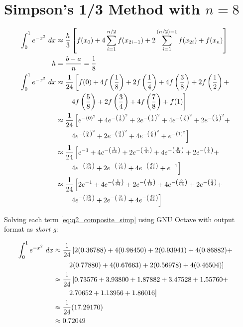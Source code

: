 \section{Simpson's 1/3 Method with $n = 8$}
	\begin{align}
		\int_{0}^{1} e^{-x^{2}} \ dx &\approx  \frac{h}{3}\left[
		f(x_{0})+
		4 \sum_{i=1}^{n/2} f(x_{2i-1}) +
		2 \sum_{i=1}^{(n/2)-1} f(x_{2i}) +
		f(x_{n})
		\right]& \\
		h &= \frac{b-a}{n} = \frac{1}{8}& \\
		\int_{0}^{1} e^{-x^{2}} \ dx &\approx  \frac{1}{24}\left[
			f(0)+
			4f\left(\frac{1}{8}\right)+
			2f\left(\frac{1}{4}\right)+
			4f\left(\frac{3}{8}\right)+
			2f\left(\frac{1}{2}\right)+
			\right.& \notag \\ &\left. \quad \quad
			4f\left(\frac{5}{8}\right)+
			2f\left(\frac{3}{4}\right)+
			4f\left(\frac{7}{8}\right)+
			f(1)
		\right]& \\
		&\approx \frac{1}{24}\left[
			e^{-(0)^{2}}+
			4e^{-\left(\frac{1}{8}\right)^{2}}+
			2e^{-\left(\frac{1}{4}\right)^{2}}+
			4e^{-\left(\frac{3}{8}\right)^{2}}+
			2e^{-\left(\frac{1}{2}\right)^{2}}+
			\right.& \notag \\ &\left. \quad \quad
			4e^{-\left(\frac{5}{8}\right)^{2}}+
			2e^{-\left(\frac{3}{4}\right)^{2}}+
			4e^{-\left(\frac{7}{8}\right)^{2}}+
			e^{-(1)^{2}}
		\right]& \notag \\
		&\approx \frac{1}{24}\left[
			e^{-1}+
			4e^{-\left(\frac{1}{64}\right)}+
			2e^{-\left(\frac{1}{16}\right)}+
			4e^{-\left(\frac{9}{64}\right)}+
			2e^{-\left(\frac{1}{4}\right)}+
			\right.& \notag \\ &\left. \quad \quad
			4e^{-\left(\frac{25}{64}\right)}+
			2e^{-\left(\frac{9}{16}\right)}+
			4e^{-\left(\frac{49}{64}\right)}+
			e^{-1}
		\right] \notag \\
		&\approx \frac{1}{24}\left[
			2e^{-1}+
			4e^{-\left(\frac{1}{64}\right)}+
			2e^{-\left(\frac{1}{16}\right)}+
			4e^{-\left(\frac{9}{64}\right)}+
			2e^{-\left(\frac{1}{4}\right)}+
			\right.& \notag \\ &\left. \quad \quad
			4e^{-\left(\frac{25}{64}\right)}+
			2e^{-\left(\frac{9}{16}\right)}+
			4e^{-\left(\frac{49}{64}\right)}
		\right]& \label{eq:q2_composite_simp}
	\end{align}

	Solving each term \cref{eq:q2_composite_simp} using GNU Octave with output format as \textit{short g}:

	\begin{align}
		\int_{0}^{1} e^{-x^{2}} \ dx &\approx \frac{1}{24}\left[
			2(0.36788)+
			4(0.98450)+
			2(0.93941)+
			4(0.86882)+
			\right.& \notag \\ &\left. \quad \quad
			2(0.77880)+
			4(0.67663)+
			2(0.56978)+
			4(0.46504)
		\right]& \notag \\
		&\approx \frac{1}{24}\left[
			0.73576+
			3.93800+
			1.87882+
			3.47528+
			1.55760+
			\right.& \notag \\ &\left. \quad \quad
			2.70652+
			1.13956+
			1.86016
		\right]& \notag \\
		&\approx \frac{1}{24}(17.29170)& \notag \\
		&\approx 0.72049&
	\end{align}
